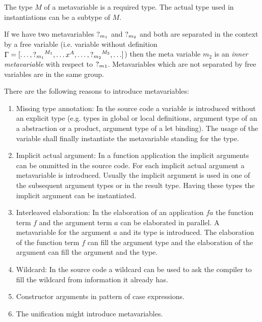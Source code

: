 The type $M$ of a metavariable is a required type. The actual type used in
instantiations can be a subtype of $M$.

If we have two metavariables ${?_{m_1}}$ and ${?_{m_2}}$ and both are separated
in the context by a free variable (i.e. variable without definition $\Gamma = [
    \ldots, {?_{m_1}}^{M_1}, \ldots x^A, \ldots, {?_{m_2}}^{M_2}, \ldots]$) then
the meta variable $m_2$ is an \emph{inner metavariable} with respect to ${?_{m}}_1$. Metavariables which are not separated by free variables are in the same
group.

There are the following reasons to introduce metavariables:
\begin{enumerate}
    \item Missing type annotation: In the source code a variable is introduced
        without an explicit type (e.g. types in global or local definitions,
        argument type of an a abstraction or a product, argument type of a let
        binding). The usage of the variable shall finally instantiate the
        metavariable standing for the type.

    \item Implicit actual argument: In a function application the implicit
        arguments can be ommitted in the source code. For each implicit actual
        argument a metavariable is introduced. Usually the implicit argument is
        used in one of the subsequent argument types or in the result type.
        Having these types the implicit argument can be instantiated.

    \item Interleaved elaboration: In the elaboration of an application $f a$
        the function term $f$ and the argument term $a$ can be elaborated in
        parallel. A metavariable for the argument $a$ and its type is
        introduced. The elaboration of the function term $f$ can fill the
        argument type and the elaboration of the argument can fill the argument
        and the type.

    \item Wildcard: In the source code a wildcard can be used to ask the
        compiler to fill the wildcard from information it already has.

    \item Constructor arguments in pattern of case expressions.

    \item The unification might introduce metavariables.
\end{enumerate}





